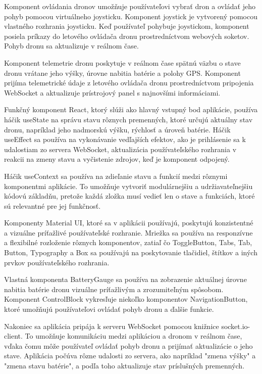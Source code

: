 Komponent ovládania dronov umožňuje používateľovi vybrať dron a ovládať jeho pohyb pomocou virtuálneho joysticku. Komponent joystick je vytvorený pomocou vlastného rozhrania joysticku. Keď používateľ pohybuje joystickom, komponent posiela príkazy do letového ovládača dronu prostredníctvom webových soketov. Pohyb dronu sa aktualizuje v reálnom čase.

Komponent telemetrie dronu poskytuje v reálnom čase spätnú väzbu o stave dronu vrátane jeho výšky, úrovne nabitia batérie a polohy GPS. Komponent prijíma telemetrické údaje z letového ovládača dronu prostredníctvom pripojenia WebSocket a aktualizuje prístrojový panel s najnovšími informáciami.

Funkčný komponent React, ktorý slúži ako hlavný vstupný bod aplikácie, používa háčik useState na správu stavu rôznych premenných, ktoré určujú aktuálny stav dronu, napríklad jeho nadmorskú výšku, rýchlosť a úroveň batérie. Háčik useEffect sa používa na vykonávanie vedľajších efektov, ako je prihlásenie sa k udalostiam zo servera WebSocket, aktualizácia používateľského rozhrania v reakcii na zmeny stavu a vyčistenie zdrojov, keď je komponent odpojený.

Háčik useContext sa používa na zdieľanie stavu a funkcií medzi rôznymi komponentmi aplikácie. To umožňuje vytvoriť modulárnejšiu a udržiavateľnejšiu kódovú základňu, pretože každá zložka musí vedieť len o stave a funkciách, ktoré sú relevantné pre jej funkčnosť.

Komponenty Material UI, ktoré sa v aplikácii používajú, poskytujú konzistentné a vizuálne príťažlivé používateľské rozhranie. Mriežka sa používa na responzívne a flexibilné rozloženie rôznych komponentov, zatiaľ čo ToggleButton, Tabs, Tab, Button, Typography a Box sa používajú na poskytovanie tlačidiel, štítkov a iných prvkov používateľského rozhrania.

Vlastná komponenta BatteryGauge sa používa na zobrazenie aktuálnej úrovne nabitia batérie dronu vizuálne príťažlivým a zrozumiteľným spôsobom. Komponent ControlBlock vykresľuje niekoľko komponentov NavigationButton, ktoré umožňujú používateľovi ovládať pohyb dronu a ďalšie funkcie.

Nakoniec sa aplikácia pripája k serveru WebSocket pomocou knižnice socket.io-client. To umožňuje komunikáciu medzi aplikáciou a dronom v reálnom čase, vďaka čomu môže používateľ ovládať pohyb dronu a prijímať aktualizácie o jeho stave. Aplikácia počúva rôzne udalosti zo servera, ako napríklad "zmena výšky" a "zmena stavu batérie", a podľa toho aktualizuje stav príslušných premenných.

